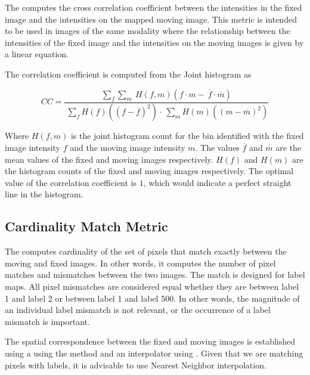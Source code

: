 The  computes the
cross correlation coefficient between the intensities in the fixed image and
the intensities on the mapped moving image. This metric is intended to be used
in images of the same modality where the relationship between the intensities
of the fixed image and the intensities on the moving images is given by a
linear equation. 

The correlation coefficient is computed from the Joint histogram as

\begin{equation}
\label{eqn:CorrelationCoefficientHistogramImageToImageMetric}
CC = \frac{ \sum_f \sum_m { \
            H(f,m) \left( f \cdot m - \
            \overline{f} \cdot \overline{m} \right)  } }{ \
            \sum_f { H(f) \left( (f - \overline{f})^2 \right) } \cdot \
            \sum_m { H(m) \left( (m - \overline{m})^2 \right) } }
\end{equation}

Where $H(f,m)$ is the joint histogram count for the bin identified with the
fixed image intensity $f$ and the moving image intensity $m$. The values
$\overline{f}$ and $\overline{m}$ are the mean values of the fixed and moving
images respectively.  $H(f)$ and $H(m)$ are the histogram counts of the fixed
and moving images respectively. The optimal value of the correlation
coefficient is $1$, which would indicate a perfect straight line in the
histogram.


\subsection{Cardinality Match Metric}
The  computes cardinality of the
set of pixels that match exactly between the moving and fixed images. In other
words, it computes the number of pixel matches and mismatches between the two
images. The match is designed for label maps. All pixel mismatches are
considered equal whether they are between label 1 and label 2 or between label
1 and label 500. In other words, the magnitude of an individual label mismatch
is not relevant, or the occurrence of a label mismatch is important. 

The spatial correspondence between the fixed and moving images is established using 
a \doxygen{Transform} using the \code{SetTransform()} method and an interpolator 
using \code{SetInterpolator()}. Given that we are matching pixels with labels, 
it is advisable to use Nearest Neighbor interpolation.

